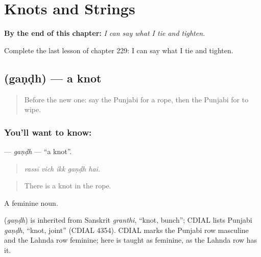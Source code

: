 
\chapter{Knots and Strings}
\label{ch:pa-a2-knots-and-strings}

\begin{chapteropening}
\textbf{By the end of this chapter:} \emph{I can say what I tie and tighten.}

Complete the last lesson of chapter 229: I can say what I tie and tighten.
\end{chapteropening}

\section[\texorpdfstring{\pa{ਗੰਢ} (gaṇḍh)}{ਗੰਢ (gaṇḍh)}]{ (gaṇḍh) — a knot}

\label{lesson:PA-C229-gandh}



\begin{quote}
Before the new one: say the Punjabi for a rope, then the Punjabi for to wipe.
\end{quote}

\subsection*{You'll want to know: }
\textbf{} — \emph{gaṇḍh} — \textquotedblleft{}a knot\textquotedblright{}.

\begin{quote}
    
\end{quote}

\begin{quote}
\emph{rassī vich ikk gaṇḍh hai.}
\end{quote}

\begin{quote}
There is a knot in the rope.
\end{quote}

A feminine noun.

\begin{cousinweb}
\textbf{} (\emph{gaṇḍh}) is inherited from Sanskrit \emph{granthi}, \textquotedblleft{}knot, bunch\textquotedblright{}; CDIAL lists Punjabi \emph{gaṇḍh}, \textquotedblleft{}knot, joint\textquotedblright{} (CDIAL 4354). CDIAL marks the Punjabi row masculine and the Lahnda row feminine; here  is taught as feminine, as the Lahnda row has it.
\end{cousinweb}

